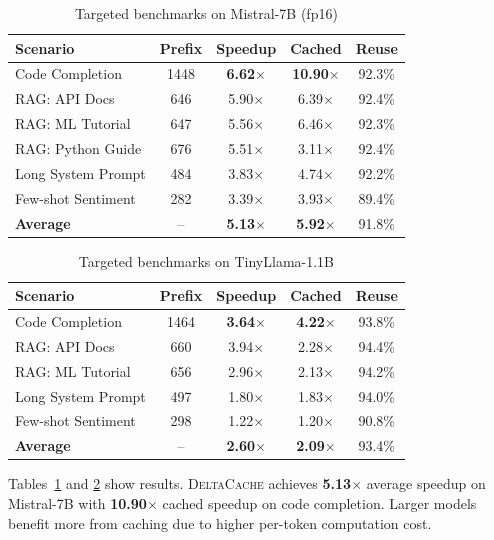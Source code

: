 \documentclass{article}
\newcommand{\deltacache}{\textsc{DeltaCache}}
\begin{document}
\begin{table}[t]
\centering
\caption{Targeted benchmarks on Mistral-7B (fp16)}
\label{tab:targeted_mistral}
\small
\begin{tabular}{lcccc}
\toprule
Scenario & Prefix & Speedup & Cached & Reuse \\
\midrule
Code Completion & 1448 & \textbf{6.62$\times$} & \textbf{10.90$\times$} & 92.3\% \\
RAG: API Docs & 646 & 5.90$\times$ & 6.39$\times$ & 92.4\% \\
RAG: ML Tutorial & 647 & 5.56$\times$ & 6.46$\times$ & 92.3\% \\
RAG: Python Guide & 676 & 5.51$\times$ & 3.11$\times$ & 92.4\% \\
Long System Prompt & 484 & 3.83$\times$ & 4.74$\times$ & 92.2\% \\
Few-shot Sentiment & 282 & 3.39$\times$ & 3.93$\times$ & 89.4\% \\
\midrule
\textbf{Average} & -- & \textbf{5.13$\times$} & \textbf{5.92$\times$} & 91.8\% \\
\bottomrule
\end{tabular}
\end{table}

\begin{table}[t]
\centering
\caption{Targeted benchmarks on TinyLlama-1.1B}
\label{tab:targeted_tinyllama}
\small
\begin{tabular}{lcccc}
\toprule
Scenario & Prefix & Speedup & Cached & Reuse \\
\midrule
Code Completion & 1464 & \textbf{3.64$\times$} & \textbf{4.22$\times$} & 93.8\% \\
RAG: API Docs & 660 & 3.94$\times$ & 2.28$\times$ & 94.4\% \\
RAG: ML Tutorial & 656 & 2.96$\times$ & 2.13$\times$ & 94.2\% \\
Long System Prompt & 497 & 1.80$\times$ & 1.83$\times$ & 94.0\% \\
Few-shot Sentiment & 298 & 1.22$\times$ & 1.20$\times$ & 90.8\% \\
\midrule
\textbf{Average} & -- & \textbf{2.60$\times$} & \textbf{2.09$\times$} & 93.4\% \\
\bottomrule
\end{tabular}
\end{table}

Tables~\ref{tab:targeted_mistral} and \ref{tab:targeted_tinyllama} show results.
\deltacache{} achieves \textbf{5.13$\times$} average speedup on Mistral-7B with \textbf{10.90$\times$} cached speedup on code completion.
Larger models benefit more from caching due to higher per-token computation cost.
\end{document}
